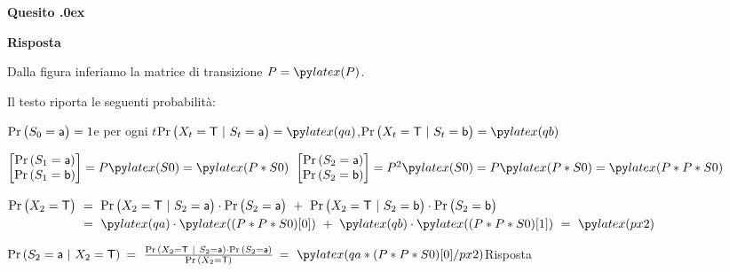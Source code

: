 \documentclass[11pt,twoside,a4paper]{article}
\newcounter{quesito}
\newenvironment{question}{\bigskip\addtocounter{quesito}{1}\bigskip\bigskip\par\textbf{Quesito \thequesito.\kern0ex}}{\par\vspace{\parskip}}
\newenvironment{answer}{\par\textbf{Risposta\quad}}{\par\vspace{\parskip}}
\begin{document}
\begin{question}
\begin{answer}

Dalla figura inferiamo la matrice di transizione $P=\pyl{P}$. 

Il testo riporta le seguenti probabilità:

$\Pr\big(S_0={\sf a}\big)=1$\hfill e per ogni $t$\hfill  $\Pr\big(X_t={\sf T}~|~S_t={\sf a}\big)=\pyl{qa}$,\hfill $\Pr\big(X_t={\sf T}~|~S_t={\sf b}\big)=\pyl{qb}$
\bigskip


$\begin{bmatrix}\Pr(S_1={\sf a})\\\Pr(S_1={\sf b})\end{bmatrix}=P\pyl{S0}=\pyl{P*S0}$
\hfil
$\begin{bmatrix}\Pr(S_2={\sf a})\\\Pr(S_2={\sf b})\end{bmatrix}=P^2\pyl{S0}= P\pyl{P*S0} =\pyl{P*P*S0}$

\medskip
$\Pr\big(X_2={\sf T}\big)\ =\ \Pr\big(X_2={\sf T}~|~S_2={\sf a}\big)\cdot\Pr\big(S_2={\sf a}\big) \ + \ \Pr\big(X_2={\sf T}~|~S_2={\sf b}\big)\cdot\Pr\big(S_2={\sf b}\big)$
\\[2ex]
$\phantom{\Pr\big(X_2={\sf T}\big)}\ =\ \pyl{qa}\cdot\pyl{(P*P*S0)[0]} \ + \ \pyl{qb}\cdot\pyl{(P*P*S0)[1]}\ =\ \pyl{px2}$

\bigskip
{\color{blue}$\Pr(S_2={\sf a}~|~X_2={\sf T})$}$\ =\ \frac{\Pr(X_2={\sf T}~|~S_2={\sf a})\cdot\Pr(S_2={\sf a})}{\Pr(X_2={\sf T})}${\color{blue}$\ =\ \pyl{qa*(P*P*S0)[0]/px2}$\hfill Risposta} 
\end{answer}
\end{question}
\end{document}
